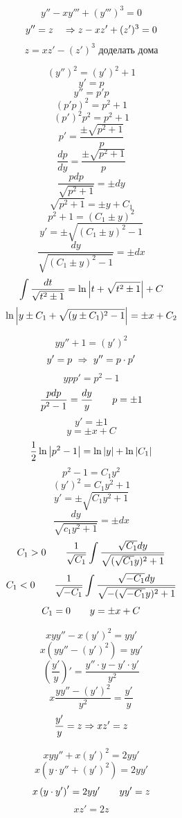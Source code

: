 \documentclass[12pt, fleqn]{article}
\begin{document}
\begin{lect}
    \begin{Task}[438]
        \[y'' - xy''' + (y''')^3 = 0\]
        \[y'' = z \quad \Rightarrow z - xz' + (z')^3 = 0\]
        \[z = xz' - (z')^3 \text{ доделать дома}\]
    \end{Task}

    \begin{Task}[436]
        \[(y'')^2 = (y')^2 + 1\]
        \[y' = p\]
        \[y''= p'p\]
        \[(p'p)^2 = p^2 + 1\]
        \[(p')^2p^2 = p^2 + 1\]
        \[p' = \frac{\pm \sqrt{p^2 + 1}}{p}\]
        \[\frac{dp}{dy} = \frac{\pm \sqrt{p^2 + 1}}{p}\]
        \[\frac{pdp}{\sqrt{p^2 + 1}} = \pm dy\]
        \[\sqrt{p^2 + 1} = \pm y + C_1\]
        \[p^2 + 1 = (C_1 \pm y)^2\]
        \[y' = \pm \sqrt{(C_1 \pm y)^2 - 1}\]
        \[\frac{dy}{\sqrt{(C_1 \pm y)^2 - 1}} = \pm dx \]
        \[\int \frac{dt}{\sqrt{t^2 \pm 1}} = \ln \left|t + \sqrt{t^2 \pm 1}\right| + C \]
        \[\ln \left|y \pm C_1 + \sqrt{(y \pm C_1)^2 - 1}\right| = \pm x + C_2\]
    \end{Task}

    \begin{Task}[226]
        \[yy'' + 1 = (y')^2\]
        \[y' = p\ \Rightarrow\ y'' = p \cdot p'\]
        \[ypp' = p^2 - 1\]
        \[\frac{pdp}{p^2 - 1} = \frac{dy}{y} \qquad p = \pm 1\]
        \[y' = \pm 1\]
        \[y = \pm x + C\]
        \[\frac{1}{2}\ln\left|p^2 - 1\right| = \ln\left|y\right| + \ln \left|C_1\right|\]
        \[p^2 - 1 = C_1y^2\]
        \[(y')^2 = C_1y^2 + 1\]
        \[y' = \pm \sqrt{C_1 y^2 + 1}\]
        \[\frac{dy}{\sqrt{c_1y^2 + 1}} = \pm dx\]
        \[C_1 > 0 \qquad \frac{1}{\sqrt{C_1}} \int \frac{\sqrt{C_1}dy}{\sqrt{(\sqrt{C_1}y)^2 + 1}}\]
        \[C_1 < 0 \qquad \frac{1}{\sqrt{-C_1}} \int \frac{\sqrt{-C_1}dy}{\sqrt{-(\sqrt{-C_1}y)^2 + 1}}\]
        \[C_1 = 0 \qquad y = \pm x + C\]
    \end{Task}

    \begin{Task}[?]
        \[xyy'' - x(y')^2 = yy'\]
        \[x(yy'' - (y')^2) = yy'\]
        \[\left(\frac{y'}{y}\right)' = \frac{y'' \cdot y - y' \cdot y'}{y^2}\]
        \[x\frac{yy'' - (y')^2}{y^2} = \frac{y'}{y}\]
        \[\frac{y'}{y} = z \Rightarrow xz' = z\]
    \end{Task}

    \begin{Task}[366]
        \[xyy'' + x(y')^2 = 2yy'\]
        \[x(y \cdot y'' + (y')^2) = 2yy'\]
        \[x\left(y \cdot y'\right)' = 2yy' \qquad yy' = z\]
        \[xz' = 2z\]
    \end{Task}


\end{lect}
\end{document}
